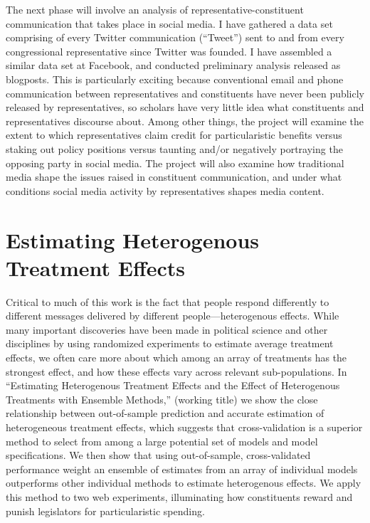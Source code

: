 \documentclass[12pt]{article}
\begin{document}
The next phase will involve an analysis of representative-constituent communication that takes place in social media.  I have gathered a data set comprising of every Twitter communication (``Tweet'') sent to and from every congressional representative since Twitter was founded. I have assembled a similar data set at Facebook, and conducted preliminary analysis released as blogposts.  This is particularly exciting because conventional email and phone communication between representatives and constituents have never been publicly released by representatives, so scholars have very little idea what constituents and representatives discourse about.  Among other things, the project will examine the extent to which representatives claim credit for particularistic benefits versus staking out policy positions versus taunting and/or negatively portraying the opposing party in social media.  The project will also examine how traditional media shape the issues raised in constituent communication, and under what conditions social media activity by representatives shapes media content.  

\section*{Estimating Heterogenous Treatment Effects}
Critical to much of this work is the fact that people respond differently to different messages delivered by different people---heterogenous effects.  While many important discoveries have been made in political science and other disciplines by using randomized experiments to estimate average treatment effects, we often care more about which among an array of treatments has the strongest effect, and how these effects vary across relevant sub-populations.  In ``Estimating Heterogenous Treatment Effects and the Effect of Heterogenous Treatments with Ensemble Methods,'' (working title) we show the close relationship between out-of-sample prediction and accurate estimation of heterogeneous treatment effects, which suggests that cross-validation is a superior method to select from among a large potential set of models and model specifications.  We then show that using out-of-sample, cross-validated performance weight an ensemble of estimates from an array of individual models outperforms other individual methods to estimate heterogenous effects.  We apply this method to two web experiments, illuminating how constituents reward and punish legislators for particularistic spending.  
\end{document}
